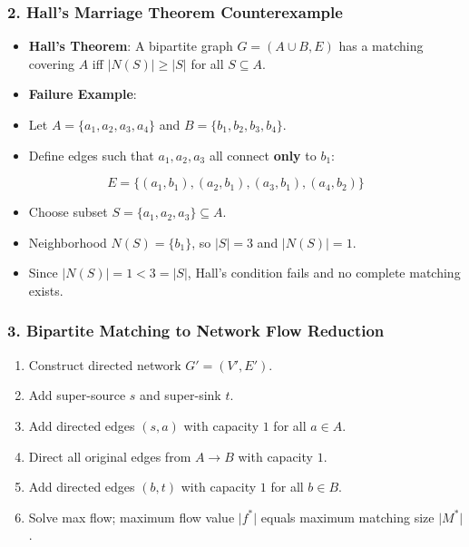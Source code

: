 \documentclass[
]{book}
\providecommand{\tightlist}{%
  \setlength{\itemsep}{0pt}\setlength{\parskip}{0pt}}
\theoremstyle{definition}
\theoremstyle{definition}
\theoremstyle{definition}
\theoremstyle{definition}
\theoremstyle{remark}
\begin{document}
\subsubsection{2. Hall's Marriage Theorem Counterexample}\label{halls-marriage-theorem-counterexample}

\begin{itemize}
\tightlist
\item
  \textbf{Hall's Theorem}: A bipartite graph \(G = (A \cup B, E)\) has a matching covering \(A\) iff \(\vert{}N(S)\vert{} \ge \vert{}S\vert{}\) for all \(S \subseteq A\).
\item
  \textbf{Failure Example}:
\item
  Let \(A = \{a_1, a_2, a_3, a_4\}\) and \(B = \{b_1, b_2, b_3, b_4\}\).
\item
  Define edges such that \(a_1, a_2, a_3\) all connect \textbf{only} to \(b_1\):
\end{itemize}

\[E = \{(a_1, b_1), (a_2, b_1), (a_3, b_1), (a_4, b_2)\}\]

\begin{itemize}
\tightlist
\item
  Choose subset \(S = \{a_1, a_2, a_3\} \subseteq A\).
\item
  Neighborhood \(N(S) = \{b_1\}\), so \(\vert{}S\vert{} = 3\) and \(\vert{}N(S)\vert{} = 1\).
\item
  Since \(\vert{}N(S)\vert{} = 1 < 3 = \vert{}S\vert{}\), Hall's condition fails and no complete matching exists.
\end{itemize}

\subsubsection{3. Bipartite Matching to Network Flow Reduction}\label{bipartite-matching-to-network-flow-reduction}

\begin{enumerate}
\def\labelenumi{\arabic{enumi}.}
\tightlist
\item
  Construct directed network \(G' = (V', E')\).
\item
  Add super-source \(s\) and super-sink \(t\).
\item
  Add directed edges \((s, a)\) with capacity \(1\) for all \(a \in A\).
\item
  Direct all original edges from \(A \to B\) with capacity \(1\).
\item
  Add directed edges \((b, t)\) with capacity \(1\) for all \(b \in B\).
\item
  Solve max flow; maximum flow value \(\vert{}f^*\vert{}\) equals maximum matching size \(\vert{}M^*\vert{}\).
\end{enumerate}
\end{document}
